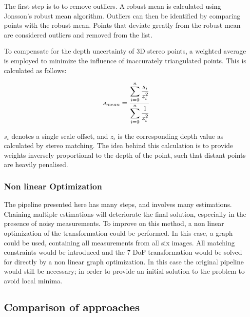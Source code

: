 The first step is to to remove outliers.  A robust mean is calculated using Jonsson's\cite{jonsson_05} robust mean algorithm.  Outliers can then be identified by comparing points with the robust mean.  Points that deviate greatly from the robust mean are considered outliers and removed from the list.

To compensate for the depth uncertainty of 3D stereo points, a weighted average is employed to minimize the influence of inaccurately triangulated points.  This is calculated as follows:

\begin{equation}
\centering
s_{mean} = \dfrac{\displaystyle\sum\limits_{i=0}^n{\dfrac{s_i}{z_i^2}}}
{\displaystyle\sum\limits_{i=0}^n{\dfrac{1}{z_i^2}}}
\end{equation}

$s_i$ denotes a single scale offset, and $z_i$ is the corresponding depth value as calculated by stereo matching.  The idea behind this calculation is to provide weights inversely proportional to the depth of the point, such that distant points are heavily penalised.  

\subsubsection{Non linear Optimization}

The pipeline presented here has many steps, and involves many estimations.  Chaining multiple estimations will deteriorate the final solution, especially in the presence of noisy measurements.  To improve on this method, a non linear optimization of the transformation could be performed.  In this case, a graph could be used, containing all measurements from all six images.  All matching constraints would be introduced and the 7 DoF transformation would be solved for directly by a non linear graph optimization.  In this case the original pipeline would still be necessary; in order to provide an initial solution to the problem to avoid local minima.

\subsection{Comparison of approaches}

